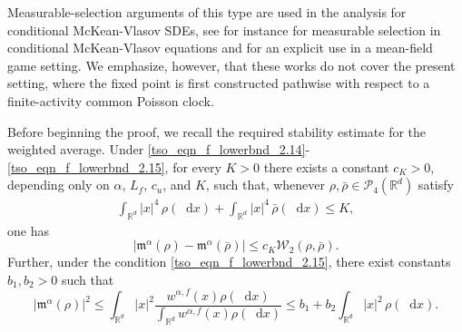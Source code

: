 \documentclass{article}
\def\R{\mathbb{R}}
\def\m{\mathfrak{m}}
\newcommand*\der{\mathop{}\!\mathrm{d}}
\numberwithin{equation}{section}
\begin{document}
 Measurable-selection arguments of this type are used in the analysis for conditional McKean-Vlasov SDEs, see for instance \cite{lacker2023superposition} for measurable selection in conditional McKean-Vlasov equations and  \cite{santambrogio2021cucker} for an explicit use in a mean-field game setting. We emphasize, however, that these works do not cover the present setting, where the fixed point is first constructed pathwise with respect to a finite-activity common Poisson clock.

Before beginning the proof, we recall the required stability estimate for the weighted average. Under
\eqref{tso_eqn_f_lowerbnd_2.14}-\eqref{tso_eqn_f_lowerbnd_2.15}, for every $K>0$ there exists a constant
$c_K>0$, depending only on $\alpha$, $L_f$, $c_u$, and $K$, such that, whenever
$\rho,\bar\rho\in\mathcal{P}_4(\R^d)$ satisfy \cite[Lemma~3.2]{carrillo2018analytical}
\begin{align}
    \int_{\mathbb R^d}|x|^4\,\rho(\der x)
    +
    \int_{\mathbb{R}^d}|x|^4\,\bar\rho(\der x)
    \le K,
\end{align}
one has
\begin{equation}
    |\m^\alpha(\rho)-\m^\alpha(\bar\rho)|
    \leq
    c_K \mathcal W_2(\rho,\bar\rho).
    \label{eq:local_lip_m}
\end{equation}
Further, under the condition \eqref{tso_eqn_f_lowerbnd_2.15}, there exist constants $b_1,b_2>0$ such that \cite[Lemma~3.3]{carrillo2018analytical}
\begin{equation}
    |\m^\alpha(\rho)|^2
    \leq
    \int_{\mathbb{R}^d}|x|^2
    \frac{w^{\alpha,f}(x)\rho(\der x)}
    {\int_{\mathbb R^d}w^{\alpha,f} (x)\rho(\der x)}
    \le
    b_1+b_2\int_{\mathbb R^d}|x|^2\,\rho(\der x).
    \label{tso_eqn_m_growth_quadratic}
\end{equation}
\end{document}
